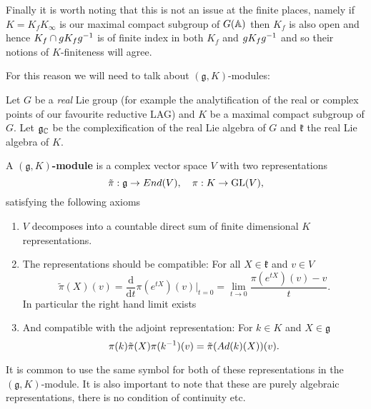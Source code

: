 \begin{example}
    Finally it is worth noting that this is not an issue at the finite places, namely if \(K = K_fK_\infty\) is our maximal compact subgroup of \(G(\A)\) then \(K_f\) is also open and hence \(K_f \cap gK_f g^{-1}\) is of finite index in both \(K_f\) and \(gK_f g^{-1}\) and so their notions of \(K\)-finiteness will agree. 
\end{example}

For this reason we will need to talk about \((\mathfrak{g}, K)\)-modules:

\begin{definition}
    Let \(G\) be a \textit{real} Lie group (for example the analytification of the real or complex points of our favourite reductive LAG) and \(K\) be a maximal compact subgroup of \(G\). Let \(\mathfrak{g}_\C\) be the complexification of the real Lie algebra of \(G\) and \(\mathfrak{k}\) the real Lie algebra of \(K\). 
    
    A \textbf{\((\mathfrak{g}, K)\)-module} is a complex vector space \(V\) with two representations 
    \[\tilde{\pi}: \mathfrak{g} \to End(V), \quad \pi: K\to \operatorname{GL}(V),\]
    satisfying the following axioms
    \begin{enumerate}
        \item \(V\) decomposes into a countable direct sum of finite dimensional \(K\) representations.
        \item The representations should be compatible: For all \(X \in \mathfrak{k}\) and \(v\in V\)
        \[\tilde{\pi}(X)(v) = \frac{\mathrm{d}}{\mathrm{d}t}\pi(e^{tX})(v)|_{t=0} = \lim_{t\to 0}\frac{\pi(e^{tX})(v) - v}{t}.\]
        In particular the right hand limit exists
        \item And compatible with the adjoint representation: For \(k\in K\) and \(X\in \mathfrak{g}\) 
         \[\pi(k)\tilde{\pi}(X) \pi(k^{-1} )(v) = \tilde{\pi}(Ad(k)(X))(v).\]
    \end{enumerate}
\end{definition}

\begin{remark}
    It is common to use the same symbol for both of these representations in the \((\mathfrak{g}, K)\)-module. It is also important to note that these are purely algebraic representations, there is no condition of continuity etc. 
\end{remark}

